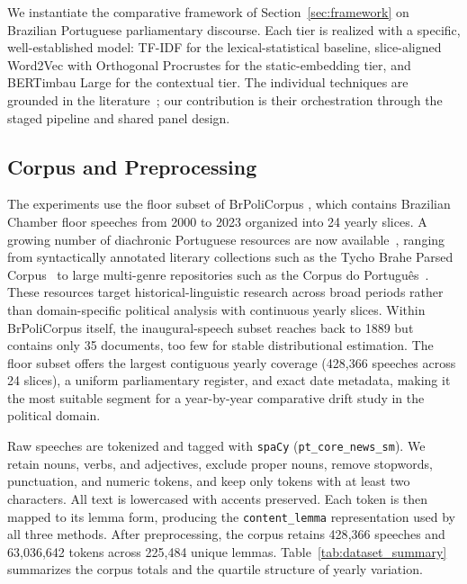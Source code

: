 \documentclass[12pt]{article}
\begin{document}
We instantiate the comparative framework of Section~\ref{sec:framework} on
Brazilian Portuguese parliamentary discourse. Each tier is realized with a
specific, well-established model: TF-IDF for the lexical-statistical baseline,
slice-aligned Word2Vec with Orthogonal Procrustes for the static-embedding
tier, and BERTimbau Large for the contextual tier. The individual techniques
are grounded in the
literature~\cite{hamilton-etal-2016-diachronic,giulianelli-etal-2020-analysing};
our contribution is their orchestration through the staged pipeline and shared
panel design.

\subsection{Corpus and Preprocessing}

The experiments use the floor subset of BrPoliCorpus
\cite{lima-lopes-2025-brpolicorpus}, which contains Brazilian Chamber floor
speeches from 2000 to 2023 organized into 24 yearly slices. A growing number
of diachronic Portuguese resources are now
available~\cite{osorio-cardoso-2025-historical}, ranging from syntactically
annotated literary collections such as the Tycho Brahe Parsed
Corpus~\cite{galves-faria-2017-tycho} to large multi-genre repositories such
as the Corpus do
Portugu\^es~\cite{davies-ferreira-2006-corpusdoportugues}. These resources
target historical-linguistic research across broad periods rather than
domain-specific political analysis with continuous yearly slices. Within
BrPoliCorpus itself, the inaugural-speech subset reaches back to 1889 but
contains only 35 documents, too few for stable distributional estimation. The
floor subset offers the largest contiguous yearly coverage (428{,}366 speeches
across 24 slices), a uniform parliamentary register, and exact date metadata,
making it the most suitable segment for a year-by-year comparative drift study
in the political domain.

Raw speeches are tokenized and tagged with
\texttt{spaCy} (\texttt{pt\_core\_news\_sm}). We retain nouns, verbs, and
adjectives, exclude proper nouns, remove stopwords, punctuation, and numeric
tokens, and keep only tokens with at least two characters. All text is
lowercased with accents preserved. Each token is then mapped to its lemma form,
producing the \texttt{content\_lemma} representation used by all three methods.
After preprocessing, the corpus retains 428{,}366 speeches and
63{,}036{,}642 tokens across 225{,}484 unique lemmas.
Table~\ref{tab:dataset_summary} summarizes the corpus totals and the quartile
structure of yearly variation.
\end{document}
